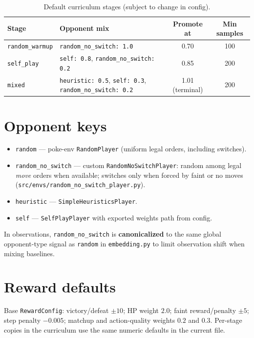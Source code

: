 \begin{table}[h]
\centering
\small
\begin{tabularx}{\textwidth}{l X c c}
\toprule
\textbf{Stage} & \textbf{Opponent mix} & \textbf{Promote at} & \textbf{Min samples} \\
\midrule
\texttt{random\_warmup} & \texttt{random\_no\_switch: 1.0} & 0.70 & 100 \\
\texttt{self\_play} & \texttt{self: 0.8}, \texttt{random\_no\_switch: 0.2} & 0.85 & 200 \\
\texttt{mixed} & \texttt{heuristic: 0.5}, \texttt{self: 0.3}, \texttt{random\_no\_switch: 0.2} & 1.01 (terminal) & 200 \\
\bottomrule
\end{tabularx}
\caption{Default curriculum stages (subject to change in config).}
\label{tab:curr}
\end{table}

\section{Opponent keys}
\begin{itemize}
  \item \texttt{random} --- poke-env \texttt{RandomPlayer} (uniform legal orders, including switches).
  \item \texttt{random\_no\_switch} --- custom \texttt{RandomNoSwitchPlayer}: random among legal \emph{move} orders when available; switches only when forced by faint or no moves (\texttt{src/envs/random\_no\_switch\_player.py}).
  \item \texttt{heuristic} --- \texttt{SimpleHeuristicsPlayer}.
  \item \texttt{self} --- \texttt{SelfPlayPlayer} with exported weights path from config.
\end{itemize}

In observations, \texttt{random\_no\_switch} is \textbf{canonicalized} to the same global opponent-type signal as \texttt{random} in \texttt{embedding.py} to limit observation shift when mixing baselines.

\section{Reward defaults}
Base \texttt{RewardConfig}: victory/defeat $\pm 10$; HP weight $2.0$; faint reward/penalty $\pm 5$; step penalty $-0.005$; matchup and action-quality weights $0.2$ and $0.3$. Per-stage copies in the curriculum use the same numeric defaults in the current file.

